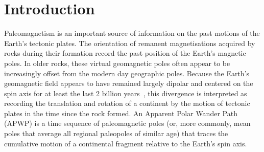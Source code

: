 \section{Introduction}

Paleomagnetism is an important source of information on the past motions of the
Earth's tectonic plates. The orientation of remanent magnetisations acquired by
rocks during their formation record the past position of the Earth's magnetic
poles. In older rocks, these virtual geomagnetic poles often appear to be
increasingly offset from the modern day geographic poles. Because the Earth's
geomagnetic field appears to have remained largely dipolar and centered on the
spin axis for at least the last 2 billion years~\citep{E06}, this divergence is
interpreted as recording the translation and rotation of a continent by the
motion of tectonic plates in the time since the rock formed. An Apparent Polar
Wander Path (APWP) is a time sequence of paleomagnetic poles (or, more commonly,
mean poles that average all regional paleopoles of similar age) that traces
the cumulative motion of a continental fragment relative to the Earth's spin
axis.

